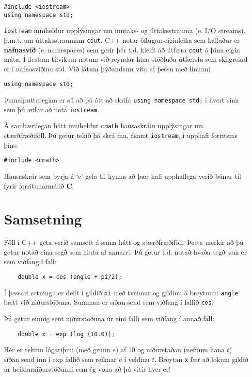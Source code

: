 \begin{verbatim}
#include <iostream>
using namespace std;
\end{verbatim}
%
{\tt iostream} inniheldur upplýsingar um inntaks- og úttaksstrauma (e. I/O streams), þ.m.t. um úttaksstrauminn {\tt cout}.
C++ notar öflugan eiginleika sem kallaður er {\bf nafnasvið} (e. namespaces) sem gerir þér t.d. kleift að útfæra {\tt cout} á þinn eigin máta.
Í flestum tilvikum notum við reyndar hina stöðluðu útfærslu sem skilgreind er í nafnasviðinu std.
Við látum þýðandann vita af þessu með línunni

\begin{verbatim}
using namespace std;
\end{verbatim}

Þumalputtareglan er sú að þú átt að skrifa {\tt using namespace std;} í hvert sinn sem þú ætlar að nota {\tt iostream}.


Á sambærilegan hátt inniheldur {\tt cmath} hausaskráin upplýsingar um stærðfræðiföll.
Þú getur tekið þá skrá inn, ásamt {\tt iostream}, í upphafi forritsins þíns: 

\begin{verbatim}
#include <cmath>
\end{verbatim}

Hausaskrár sem byrja á `c' gefa til kynna að þær hafi upphaflega verið búnar til fyrir forritunarmálið {\bf C}.

\section {Samsetning}
\label{composition}

Föll í C++ geta verið samsett á sama hátt og stærðfræðiföll.
Þetta merkir að þú getur notað eina segð sem hluta af annarri.
Þú getur t.d. notað hvaða segð sem er sem viðfang í fall:

\begin{verbatim}
    double x = cos (angle + pi/2);
\end{verbatim}
%
Í þessari setningu er deilt í gildið {\tt pi} með tveimur og gildinu á breytunni {\tt angle} bætt við niðurstöðuna.
Summan er síðan send sem viðfang í fallið {\tt cos}.

Þú getur einnig sent niðurstöðuna úr eini falli sem viðfang í annað fall:

\begin{verbatim}
    double x = exp (log (10.0));
\end{verbatim}
%
Hér er tekinn lógariþmi (með grunn $e$) af 10 og niðurstaðan (nefnum hana $t$) síðan send inn í exp fallið sem reiknar $e$ í veldinu $t$.
Breytan {\tt x} fær að lokum gildið úr heildarniðurstöðunni sem ég vona að þú vitir hver er!

